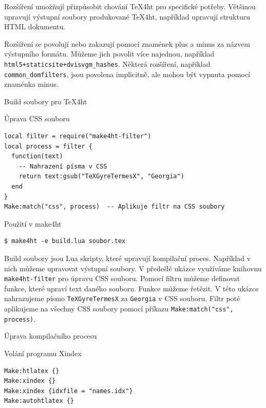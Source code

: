 Rozšíření umožňují přizpůsobit chování \TeX4ht pro specifické potřeby. Většinou upravují výstupní soubory
produkované \TeX4ht, například  upravují strukturu HTML dokumentu. 

Rozšíření se povolují nebo zakazují pomocí znamének plus a minus za názvem výstupního formátu. 
Můžeme jich povolit více najednou, například \verb|html5+staticsite+dvisvgm_hashes|.
Některá rozšíření, například \verb|common_domfilters|, jsou povolena implicitně, ale mohou být vypnuta pomocí znaménka minus.

\begin{frame}[fragile]{Build soubory pro TeX4ht}

\begin{block}{Úprava CSS souboru}
\begin{verbatim}
local filter = require("make4ht-filter")  
local process = filter {  
  function(text)  
    -- Nahrazení písma v CSS  
    return text:gsub("TeXGyreTermesX", "Georgia")  
  end  
}  
Make:match("css", process)  -- Aplikuje filtr na CSS soubory
\end{verbatim}
\end{block}

\begin{block}{Použití v make4ht}
\begin{verbatim}
$ make4ht -e build.lua soubor.tex
\end{verbatim}
\end{block}
\end{frame}

Build soubory jsou Lua skripty, které upravují kompilační proces. Například 
v nich můžeme upravovat výstupní soubory. V předešlé ukázce využíváme 
knihovnu \texttt{make4ht-filter} pro úpravu CSS souboru. Pomocí filtru 
můžeme definovat funkce, které upraví text daného souboru. Funkce můžeme řetězit.
V této ukázce nahrazujeme písmo \texttt{TeXGyreTermesX} za \texttt{Georgia} v CSS souboru.
Filtr poté aplikujeme na všechny CSS soubory pomocí příkazu \texttt{Make:match("css", process)}.

\begin{frame}[fragile]{Úprava kompilačního procesu}
\begin{block}{Volání programu Xindex}
\begin{verbatim}
Make:htlatex {} 
Make:xindex {} 
Make:xindex {idxfile = "names.idx"}
Make:autohtlatex {}
\end{verbatim}
\end{block}

\end{frame}

